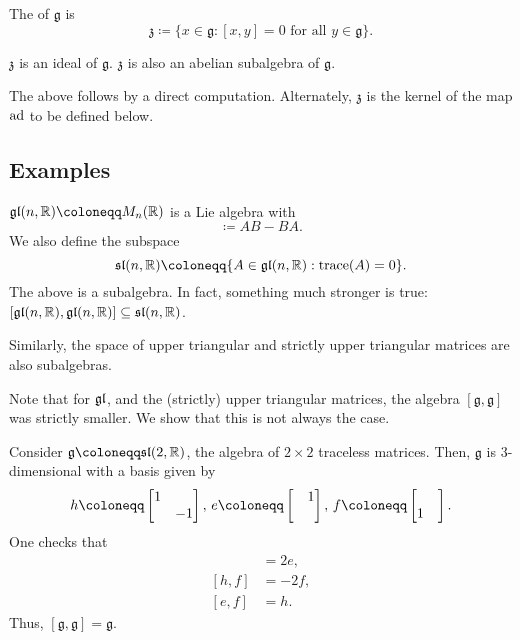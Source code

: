 \documentclass[12pt]{article}
\begin{document}
\begin{defn}
	The  of $\mathfrak{g}$ is 
	\begin{equation*} 
		\mathfrak{z} \coloneqq \{x \in \mathfrak{g} : [x, y] = 0 \text{ for all } y \in \mathfrak{g}\}.
	\end{equation*}
\end{defn}

\begin{thm}
	$\mathfrak{z}$ is an ideal of $\mathfrak{g}$. 
	$\mathfrak{z}$ is also an abelian subalgebra of $\mathfrak{g}$.
\end{thm}
The above follows by a direct computation. Alternately, $\mathfrak{z}$ is the kernel of the map $\operatorname{ad}$ to be defined below.

\subsection{Examples}

\begin{ex}
	$\gl(n, \mathbb{R}) \coloneqq M_{n}(\mathbb{R})$ is a Lie algebra with
	\begin{equation*} 
		[A, B] \coloneqq AB - BA.
	\end{equation*}
	We also define the subspace
	\begin{equation*} 
		\sl(n, \mathbb{R}) \coloneqq \{A \in \gl(n, \mathbb{R}) : \trace(A) = 0\}.
	\end{equation*}
	The above is a subalgebra. \newline
	In fact, something much stronger is true: $[\mathfrak{gl}(n, \mathbb{R}), \mathfrak{gl}(n, \mathbb{R})] \subseteq \mathfrak{sl}(n, \mathbb{R})$.

	Similarly, the space of upper triangular and strictly upper triangular matrices are also subalgebras.
\end{ex}
Note that for $\mathfrak{gl}$, and the (strictly) upper triangular matrices, the algebra $[\mathfrak{g}, \mathfrak{g}]$ was strictly smaller. 
We show that this is not always the case.

\begin{ex} \label{ex:sl-2-algebra-computation}
	Consider $\mathfrak{g} \coloneqq \sl(2, \mathbb{R})$, the algebra of $2 \times 2$ traceless matrices. 
	Then, $\mathfrak{g}$ is $3$-dimensional with a basis given by
	\begin{equation*} 
		h \coloneqq \two{1}{}{}{-1},\, e \coloneqq \two{}{1}{}{},\, f \coloneqq \two{}{}{1}{}.
	\end{equation*}
	One checks that
	\begin{align*} 
		[h, e] &= 2e, \\
		[h, f] &= -2f, \\
		[e, f] &= h.
	\end{align*}
	Thus, $[\mathfrak{g}, \mathfrak{g}] = \mathfrak{g}$.
\end{ex}
\end{document}

